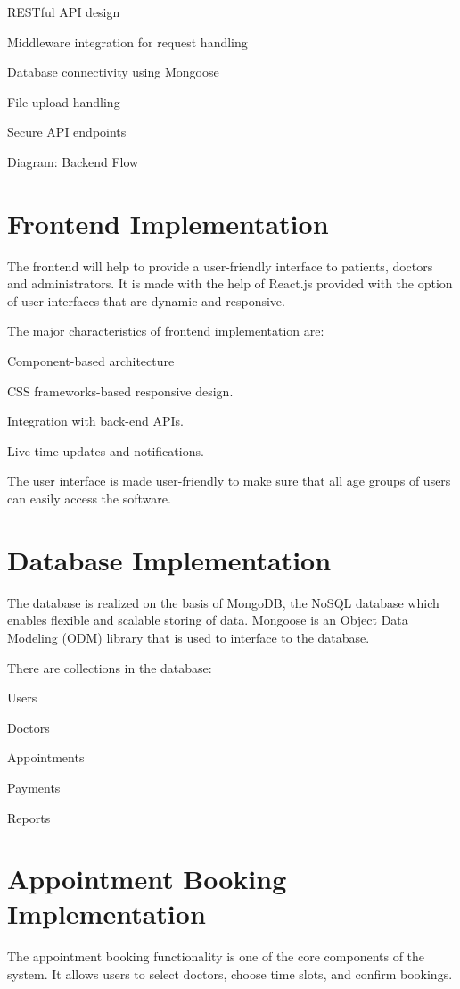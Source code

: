RESTful API design

Middleware integration for request handling

Database connectivity using Mongoose

File upload handling

Secure API endpoints

Diagram: Backend Flow

\section{Frontend Implementation}

The frontend will help to provide a user-friendly interface to patients, doctors and administrators. It is made with the help of React.js provided with the option of user interfaces that are dynamic and responsive.

The major characteristics of frontend implementation are:

Component-based architecture

CSS frameworks-based responsive design.

Integration with back-end APIs.

Live-time updates and notifications.

The user interface is made user-friendly to make sure that all age groups of users can easily access the software.

\section{Database Implementation}

The database is realized on the basis of MongoDB, the NoSQL database which enables flexible and scalable storing of data. Mongoose is an Object Data Modeling (ODM) library that is used to interface to the database.

There are collections in the database:

Users

Doctors

Appointments

Payments

Reports

\section{Appointment Booking Implementation}

The appointment booking functionality is one of the core components of the system. It allows users to select doctors, choose time slots, and confirm bookings.


